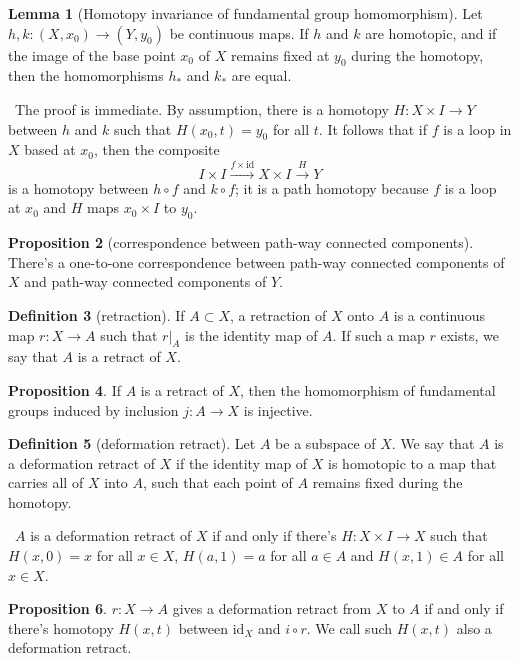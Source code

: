 \documentclass[12pt,a4paper]{book}
\newenvironment{prooff}{{\noindent\it\textcolor{cyan!40!black}{Proof}:}\,}{\par}
\theoremstyle{definition}
\newtheorem{defn}{Definition}[section]
\newtheorem{lem}[defn]{Lemma}
\newtheorem{prop}[defn]{Proposition}
\begin{document}
\begin{lem}[Homotopy invariance of fundamental group homomorphism]
    Let $h, k:\left(X, x_0\right) \rightarrow\left(Y, y_0\right)$ be continuous maps. If $h$ and $k$ are homotopic, and if the image of the base point $x_0$ of $X$ remains fixed at $y_0$ during the homotopy, then the homomorphisms $h_*$ and $k_*$ are equal.
\end{lem}
\begin{prooff}
    The proof is immediate. By assumption, there is a homotopy $H: X \times I \rightarrow Y$ between $h$ and $k$ such that $H\left(x_0, t\right)=y_0$ for all $t$. It follows that if $f$ is a loop in $X$ based at $x_0$, then the composite
    $$
        I \times I \xrightarrow{f \times \mathrm{id}} X \times I \xrightarrow{H} Y
    $$
    is a homotopy between $h \circ f$ and $k \circ f$; it is a path homotopy because $f$ is a loop at $x_0$ and $H$ maps $x_0 \times I$ to $y_0$.
\end{prooff}
\begin{prop}[correspondence between path-way connected components]
    There's a one-to-one correspondence between path-way connected components of $X$
    and path-way connected components of $Y$.
\end{prop}
\begin{defn}[retraction]
    If $A \subset X$, a retraction of $X$ onto $A$ is a continuous map $r: X \rightarrow A$ such that $r|_A$ is the identity map of $A$. If such a map $r$ exists, we say that $A$ is a retract of $X$.
\end{defn}
\begin{prop}
    If $A$ is a retract of $X$, then the homomorphism of fundamental groups induced by inclusion $j: A \rightarrow X$ is injective.
    \label{proposition:retraction induce injective homomorphism}
\end{prop}
\begin{defn}[deformation retract]
    Let $A$ be a subspace of $X$. We say that $A$ is a deformation retract of $X$
    if the identity map of $X$ is homotopic to
    a map that carries all of $X$ into $A$, such that each point of $A$ remains
    fixed during the homotopy.
\end{defn}
\begin{prooff}
    $A$ is a deformation retract of $X$ if and only if there's $H:X\times I\rightarrow X$
    such that $H(x,0)=x$ for all $x\in X$, $H(a,1)=a$ for all $a\in A$ and $H(x,1)\in A$ for all $x\in X$.
\end{prooff}
\begin{prop}
    $r:X\rightarrow A$ gives a deformation retract from $X$ to $A$ if and only if there's homotopy $H(x,t)$ between $\text{id}_X$ and $i\circ r$.
    We call such $H(x,t)$ also a deformation retract.
\end{prop}
\end{document}
